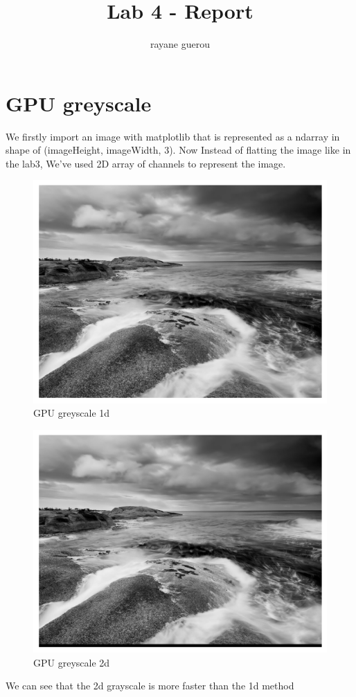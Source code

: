 \documentclass[a4paper]{article}
\title{Lab 4 - Report}
\author{rayane guerou}
\begin{document}
\maketitle

\section{GPU greyscale}
We firstly import an image with matplotlib that is represented as a ndarray in shape of (imageHeight, imageWidth, 3).
Now Instead of flatting the image like in the lab3, We've used 2D array of channels to represent the image.

\begin{figure}[h!]
\centering
\includegraphics[scale=0.5]{../src/gpu1d.png}
\caption{GPU greyscale 1d}
\end{figure}

\begin{figure}[h!]
    \centering
    \includegraphics[scale=0.5]{../src/gpu2d.png}
    \caption{GPU greyscale 2d}
\end{figure}

We can see that the 2d grayscale is more faster than the 1d method
\end{document}
